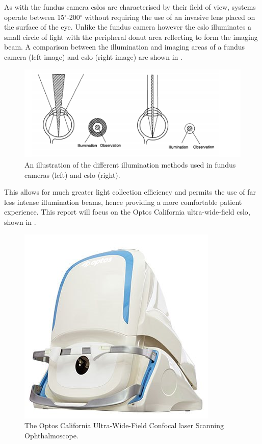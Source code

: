 As with the fundus camera \Gls{cslo}s are characterised by their field of view,
systems operate between 15$^\circ$-200$^\circ$ without requiring the use
of an invasive lens placed on the surface of the eye. Unlike the fundus
camera however the \Gls{cslo} illuminates a small circle of light with the
peripheral donut area reflecting to form the imaging beam. A comparison
between the illumination and imaging areas of a fundus camera (left image)
and \gls{cslo} (right image) are shown in  .

\begin{figure}[H]
\centering
\includegraphics{figures/illumination}
\caption{An illustration of the different illumination methods used in fundus cameras (left) and \Gls{cslo} (right).\cite{5_bennett_2015}}
\label{fig:illum}
   \end{figure}

This allows for much greater light collection efficiency and permits the use
of far less intense illumination beams, hence providing a more comfortable
patient experience.\cite{5_bennett_2015} This report will focus on the Optos
California ultra-wide-field \Gls{cslo}, shown in .

\begin{figure}[H]
\centering
\includegraphics{figures/california}
\caption{The Optos California Ultra-Wide-Field Confocal \gls{laser} Scanning Ophthalmoscope.\cite{1_optos.com_2015}}
\label{fig:cali}
   \end{figure}


